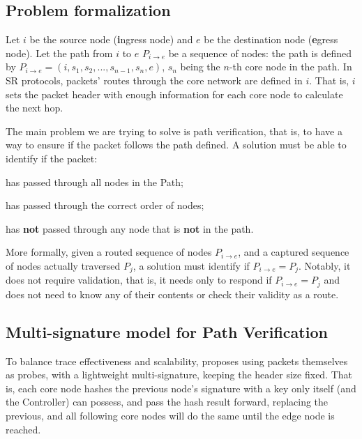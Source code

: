 

\subsection{Problem formalization} \label{sec:formalization}
\newcommand{\Pie}{P_{i \rightarrow e}}

Let $i$ be the source node (\textbf{i}ngress node) and $e$ be the destination node (\textbf{e}gress node). Let the path from $i$ to $e$ $\Pie$ be a sequence of nodes: the path is defined by $ \Pie = (i, s_1, s_2, ..., s_{n - 1}, s_n, e) $\label{eq:path-def}, $s_n$ being the $n$-th core node in the path. In SR protocols, packets' routes through the core network are defined in $i$. That is, $i$ sets the packet header with enough information for each core node to calculate the next hop. 


The main problem we are trying to solve is path verification, that is, to have a way to ensure if the packet follows the path defined. A solution must be able to identify if the packet:
\begin{inlinelist}
    \item has passed through all nodes in the Path;
    \item has passed through the correct order of nodes;
    \item has \textbf{not} passed through any node that is \textbf{not} in the path.
\end{inlinelist}




More formally, given a routed sequence of nodes $P_{i \rightarrow e}$, and a captured sequence of nodes actually traversed $P_j$, a solution must identify if $P_{i \rightarrow e} = P_j$.
Notably, it does not require validation, that is, it needs only to respond if $P_{i \rightarrow e} = P_j$ and does not need to know any of their contents or check their validity as a route.


\subsection{Multi-signature model for Path Verification} \label{sec:multisigmodel}

To balance trace effectiveness and scalability, \pathsec proposes using packets themselves as probes\cite{pathsec}\cite{PINT2020}, with a lightweight multi-signature, keeping the header size fixed. That is, each core node hashes the previous node's signature with a key only itself (and the Controller) can possess, and pass the hash result forward, replacing the previous, and all following core nodes will do the same until the edge node is reached. 

